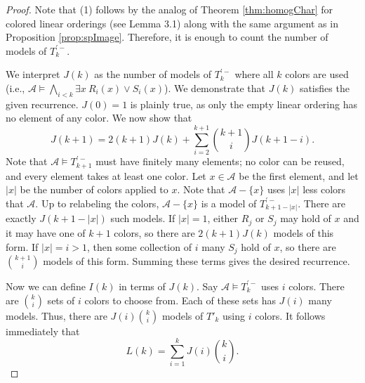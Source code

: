\documentclass[11pt]{amsart}
\theoremstyle{definition}
\def\A{\mathcal A}
\begin{document}
\begin{proof}
    Note that (1) follows by the analog of Theorem \ref{thm:homogChar} for colored linear orderings (see \cite{ST08} Lemma 3.1) along with the same argument as in Proposition \ref{prop:spImage}.
    Therefore, it is enough to count the number of models of $T^{'-}_k$.

    We interpret $J(k)$ as the number of models of $T^{'-}_k$ where all $k$ colors are used (i.e., $\A\models \bigwedge_{i<k} \exists x ~R_i(x) \lor S_i(x)$).
    We demonstrate that $J(k)$ satisfies the given recurrence.
    $J(0)=1$ is plainly true, as only the empty linear ordering has no element of any color.
    We now show that 
    \[ J(k+1)= 2(k+1)J(k)+\sum_{i=2}^{k+1} {k+1 \choose i} J(k+1-i).\]
    Note that $\A\models T^{'-}_{k+1}$ must have finitely many elements; no color can be reused, and every element takes at least one color.
    Let $x\in\A$ be the first element, and let $|x|$ be the number of colors applied to $x$.
    Note that $\A-\{x\}$ uses $|x|$ less colors that $\A$.
    Up to relabeling the colors, $\A-\{x\}$ is a model of $T^{'-}_{k+1-|x|}$.
    There are exactly $J(k+1-|x|)$ such models.
    If $|x|=1$, either $R_j$ or $S_j$ may hold of $x$ and it may have one of $k+1$ colors, so there are $2(k+1)J(k)$ models of this form.
    If $|x|=i>1$, then some collection of $i$ many $S_j$ hold of $x$, so there are ${k+1 \choose i}$ models of this form.
    Summing these terms gives the desired recurrence.

    Now we can define $I(k)$ in terms of $J(k)$.
    Say $\A\models T^{'-}_k$ uses $i$ colors.
    There are ${k \choose i}$ sets of $i$ colors to choose from.
    Each of these sets has $J(i)$ many models.
    Thus, there are $J(i) {k \choose i}$ models of $T'_k$ using $i$ colors.
    It follows immediately that 
    \[L(k)=\sum_{i=1}^{k} J(i) {k \choose i}.\]


\end{proof}
\end{document}
